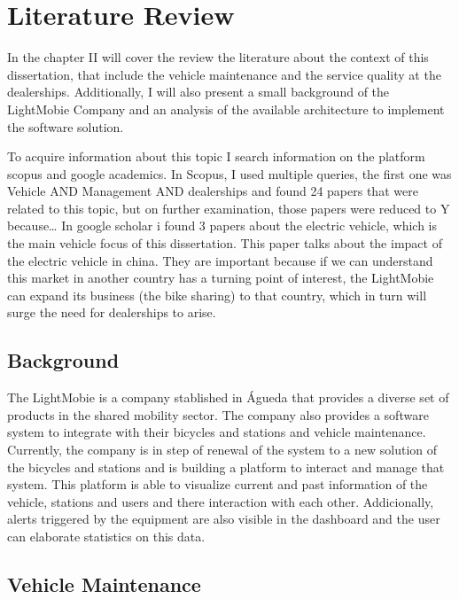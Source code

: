 \chapter{Literature Review}%
\label{chapter:literatureReview}

\begin{introduction}
In the chapter II will cover the review the literature about the context of this dissertation, that include the vehicle maintenance and the service quality at the dealerships. 
Additionally, I will also present a small background of the LightMobie Company and an analysis of the available architecture to implement the software solution.
\end{introduction} 


To acquire information about this topic I search information on the platform scopus and google academics. 
In Scopus, I used multiple queries, the first one was Vehicle AND Management AND dealerships and found 24 papers that were related to this topic, but on further examination, those papers were reduced to Y because… 
In google scholar i found 3 papers about the electric vehicle, which is the main vehicle focus of this dissertation. 
This paper talks about the impact of the electric vehicle in china. 
They are important because if we can understand this market in another country has a turning point of interest, the LightMobie can expand its business (the bike sharing) to that country, which in turn will surge the need for dealerships to arise.  


\section{Background}

The LightMobie is a company stablished in Águeda that provides a diverse set of products in the shared mobility sector. 
The company also provides a software system to integrate with their bicycles and stations and vehicle maintenance.
Currently, the company is in step of renewal of the system to a new solution of the bicycles and stations and is building a platform to interact and manage that system.
This platform is able to visualize current and past information of the vehicle, stations and users and there interaction with each other.
Addicionally, alerts triggered by the equipment are also visible in the dashboard and the user can elaborate statistics on this data.

\section{Vehicle Maintenance}

